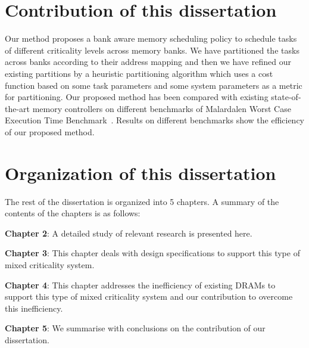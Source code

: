 \section{Contribution of this dissertation}\label{contri}
\noindent
Our method proposes a bank aware memory scheduling policy to schedule tasks of different criticality levels across memory banks. 
We have partitioned the tasks across banks according to their address mapping and then we have refined our existing partitions 
by a heuristic partitioning algorithm which uses a cost function based on some task parameters and some system 
parameters as a metric for partitioning. Our proposed method has been compared with existing state-of-the-art memory 
controllers on different benchmarks of Malardalen Worst Case Execution Time Benchmark~\cite{gustafsson2010malardalen}. 
Results on different benchmarks show the efficiency of our proposed method. 
 

\section{Organization of this dissertation}\label{org}
\noindent
The rest of the dissertation is organized into 5 chapters. A summary of the contents of the chapters is as follows:
\begin{description}
 \item {\bf Chapter 2}: A detailed study of relevant research is presented here.
 
 \item {\bf Chapter 3}: This chapter deals with design specifications to support this type of mixed criticality system.
 
 \item {\bf Chapter 4}: This chapter addresses the inefficiency of existing DRAMs to support this type of mixed criticality
 system and our contribution to overcome this inefficiency.
 
 \item {\bf Chapter 5}: We summarise with conclusions on the contribution of our dissertation.
 
\end{description}

